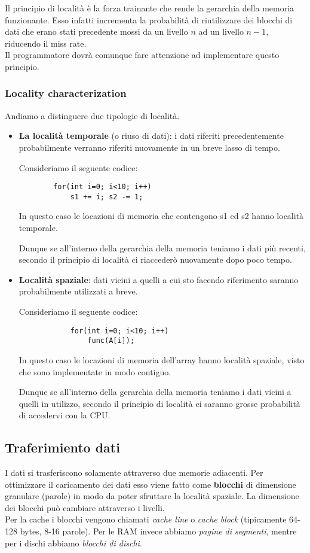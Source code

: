Il principio di località è la forza trainante che rende la gerarchia della memoria funzionante. Esso infatti incrementa la probabilità di riutilizzare dei blocchi di dati che erano stati precedente mossi da un livello $n$ ad un livello $n-1$, riducendo il miss rate.\\ Il programmatore dovrà comunque fare attenzione ad implementare questo principio.

\subsubsection{Locality characterization}
Andiamo a distinguere due tipologie di località. 
\begin{itemize}
    \item \textbf{La località temporale} (o riuso di dati): i dati riferiti precedentemente probabilmente verranno riferiti nuovamente in un breve lasso di tempo.
    \begin{example}
    Consideriamo il seguente codice:
    \begin{lstlisting}
    	for(int i=0; i<10; i++)
    		s1 += i; s2 -= 1;
    \end{lstlisting}
    In questo caso le locazioni di memoria che contengono s1 ed s2 hanno località temporale.
    \end{example}
    Dunque se all'interno della gerarchia della memoria teniamo i dati più recenti, secondo il principio di località ci riaccederò nuovamente dopo poco tempo.
    
    \item \textbf{Località spaziale}: dati vicini a quelli a cui sto facendo riferimento saranno probabilmente utilizzati a breve.
    \begin{example}
    	Consideriamo il seguente codice:
    	\begin{lstlisting}
    		for(int i=0; i<10; i++)
    			func(A[i]);
    	\end{lstlisting}
    	In questo caso le locazioni di memoria dell'array hanno località spaziale, visto che sono implementate in modo contiguo.
    \end{example}
    Dunque se all'interno della gerarchia della memoria teniamo i dati vicini a quelli in utilizzo, secondo il principio di località ci saranno grosse probabilità di accedervi con la CPU.
\end{itemize}


\subsection{Traferimiento dati}
I dati si trasferiscono solamente attraverso due memorie adiacenti. Per ottimizzare il caricamento dei dati esso viene fatto come \textbf{blocchi} di dimensione granulare (parole) in modo da poter sfruttare la località spaziale. La dimensione dei blocchi può cambiare attraverso i livelli.\\
Per la cache i blocchi vengono chiamati \textit{cache line} o \textit{cache block} (tipicamente 64-128 bytes, 8-16 parole). Per le RAM invece abbiamo \textit{pagine di segmenti}, mentre per i dischi abbiamo \textit{blocchi di dischi}.\\

